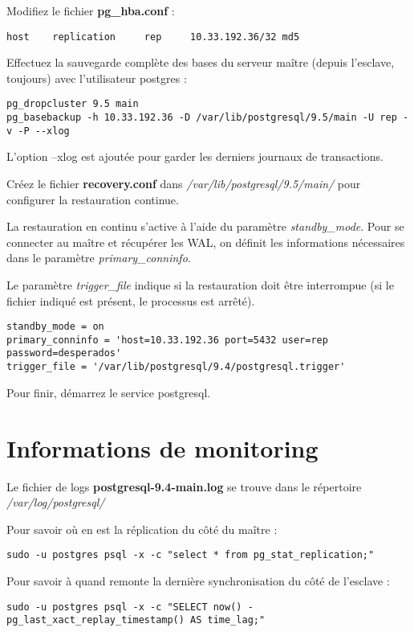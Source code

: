 Modifiez le fichier \textbf{pg\_hba.conf} :
\begin{lstlisting}
host    replication     rep     10.33.192.36/32 md5 
\end{lstlisting}

Effectuez la sauvegarde complète des bases du serveur maître (depuis l'esclave, toujours) avec l'utilisateur postgres :
\begin{lstlisting}
pg_dropcluster 9.5 main
pg_basebackup -h 10.33.192.36 -D /var/lib/postgresql/9.5/main -U rep -v -P --xlog
\end{lstlisting}

L'option --xlog est ajoutée pour garder les derniers journaux de transactions.

Créez le fichier \textbf{recovery.conf} dans \textit{/var/lib/postgresql/9.5/main/} pour configurer la restauration continue.

La restauration en continu s'active à l'aide du paramètre \textit{standby\_mode}. Pour se connecter au maître et récupérer les WAL, on définit les informations nécessaires dans le paramètre \textit{primary\_conninfo}. 

Le paramètre \textit{trigger\_file} indique si la restauration doit être interrompue (si le fichier indiqué est présent, le processus est arrêté).
\begin{lstlisting}
standby_mode = on 
primary_conninfo = 'host=10.33.192.36 port=5432 user=rep password=desperados' 
trigger_file = '/var/lib/postgresql/9.4/postgresql.trigger' 
\end{lstlisting}

Pour finir, démarrez le service postgresql.

\section{Informations de monitoring}

Le fichier de logs \textbf{postgresql-9.4-main.log} se trouve dans le répertoire \textit{/var/log/postgresql/}

Pour savoir où en est la réplication du côté du maître :
\begin{lstlisting}
sudo -u postgres psql -x -c "select * from pg_stat_replication;"
\end{lstlisting}

Pour savoir à quand remonte la dernière synchronisation du côté de l'esclave :
\begin{lstlisting}
sudo -u postgres psql -x -c "SELECT now() - pg_last_xact_replay_timestamp() AS time_lag;"
\end{lstlisting}


